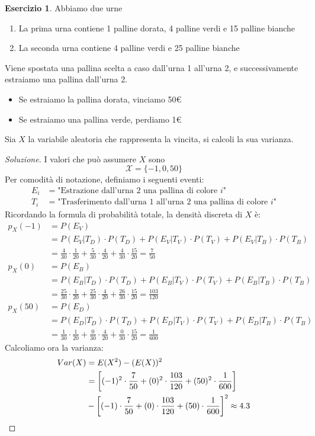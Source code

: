 \documentclass{article}
\theoremstyle{plain}
\theoremstyle{definition}
\newtheorem{esercizio}{Esercizio}[section]
\theoremstyle{remark}
\newenvironment{soluzione}
	{\renewcommand\qedsymbol{$\mathwitch*$}\begin{proof}[Soluzione]}
	{\end{proof}}
\renewcommand{\qedsymbol}{$\mathrightghost$}
\begin{document}
\begin{esercizio}
	Abbiamo due urne
	\begin{enumerate}
		\item La prima urna contiene 1 palline dorata, 4 palline verdi e 15 palline bianche
		\item La seconda urna contiene 4 palline verdi e 25 palline bianche
	\end{enumerate}
	Viene spostata una pallina scelta a caso dall'urna 1 all'urna 2, e successivamente estraiamo una pallina dall'urna 2.
	\begin{itemize}
		\item Se estraiamo la pallina dorata, vinciamo 50€
		\item Se estraiamo una pallina verde, perdiamo 1€
	\end{itemize}
	Sia $X$ la variabile aleatoria che rappresenta la vincita, si calcoli la sua varianza.
	\begin{soluzione}
		I valori che può assumere $X$ sono
		\begin{equation*}
			\mathcal{X}=\{-1,0,50\}
		\end{equation*}
		Per comodità di notazione, definiamo i seguenti eventi:
		\begin{align*}
			E_i&=\text{"Estrazione dall'urna 2 una pallina di colore $i$"}\\
			T_i&=\text{"Trasferimento dall'urna 1 all'urna 2 una pallina di colore $i$"}
		\end{align*}
		Ricordando la formula di probabilità totale, la densità discreta di $X$ è:
		\begin{align*}
			p_X(-1)&=P(E_V)\\
			&=P(E_V|T_D)\cdot P(T_D)+P(E_V|T_V)\cdot P(T_V)+P(E_V|T_B)\cdot P(T_B)\\
			&=\frac{4}{30}\cdot\frac{1}{20}+\frac{5}{30}\cdot\frac{4}{20}+\frac{4}{30}\cdot\frac{15}{20}=\frac{7}{50}\\
			p_X(0)&=P(E_B)\\
			&=P(E_B|T_D)\cdot P(T_D)+P(E_B|T_V)\cdot P(T_V)+P(E_B|T_B)\cdot P(T_B)\\
			&=\frac{25}{30}\cdot\frac{1}{20}+\frac{25}{30}\cdot\frac{4}{20}+\frac{26}{30}\cdot\frac{15}{20}=\frac{103}{120}\\
			p_X(50)&=P(E_D)\\
			&=P(E_D|T_D)\cdot P(T_D)+P(E_D|T_V)\cdot P(T_V)+P(E_D|T_B)\cdot P(T_B)\\
			&=\frac{1}{30}\cdot\frac{1}{20}+\frac{0}{30}\cdot\frac{4}{20}+\frac{0}{30}\cdot\frac{15}{20}=\frac{1}{600}
		\end{align*}
		Calcoliamo ora la varianza:
		\begin{align*}
			Var(X)&=E(X^2)-(E(X))^2\\
			&=\left[(-1)^2\cdot\frac{7}{50}+(0)^2\cdot\frac{103}{120}+(50)^2\cdot\frac{1}{600}\right]\\
			&-\left[(-1)\cdot\frac{7}{50}+(0)\cdot\frac{103}{120}+(50)\cdot\frac{1}{600}\right]^2\approx4.3\qedhere
		\end{align*}
	\end{soluzione}
\end{esercizio}
\end{document}
